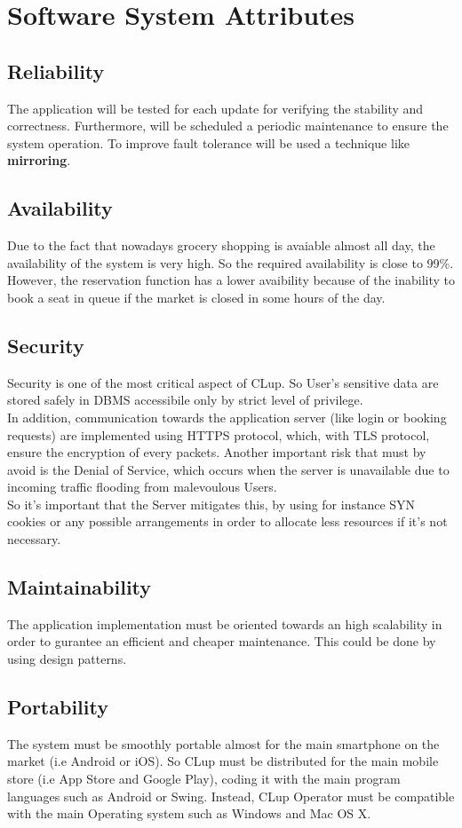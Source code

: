 \bigskip
\par
\section{Software System Attributes}
\subsection{Reliability}
The application will be tested for each update for verifying the stability and correctness.
Furthermore, will be scheduled a periodic maintenance to ensure the system operation.
To improve fault tolerance will be used a technique like \textbf{mirroring}.
 

\subsection{Availability}
Due to the fact that nowadays grocery shopping is avaiable almost all day, the availability of the system is very high. So the required availability is close to 99\%. \\
However, the reservation function has a lower avaibility because of the inability to book a seat in queue if the market is closed in some hours of the day. 
\subsection{Security}
Security is one of the most critical aspect of CLup. So User's sensitive data are stored safely in DBMS accessibile only by strict level of privilege.\\ 
In addition, communication towards the application server (like login or booking requests) are implemented using  HTTPS protocol, which, with TLS protocol, ensure the encryption of every packets. Another important risk that must by avoid is the Denial of Service, which occurs when the server is unavailable due to incoming traffic flooding from malevoulous Users.\\
So it's important that the Server mitigates this, by using for instance SYN cookies or any possible arrangements in order to allocate less resources if it's not necessary.
\subsection{Maintainability}
The application implementation must be oriented towards an high scalability in order to gurantee an efficient and cheaper maintenance. This could be done by using design patterns.
\subsection{Portability}
The system must be smoothly portable almost for the main smartphone on the market (i.e Android or iOS). So CLup must be distributed for the main mobile store (i.e App Store and Google Play), coding it with the main program languages such as Android or Swing. Instead, CLup Operator
must be compatible with the main Operating system such as Windows and Mac OS X. 